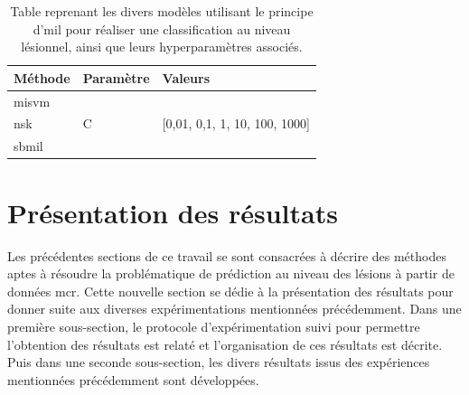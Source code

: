 \begin{table}[H]
    \centering
    \begin{tabular}{lll}
    \toprule
    \textbf{Méthode}    & \textbf{Paramètre}& \textbf{Valeurs}                                  \\ \midrule
    \gls{misvm}         & \multirow{3}{*}{C}& \multirow{3}{*}{[0,01, 0,1, 1, 10, 100, 1000]}    \\ \cline{1-1}
    \gls{nsk}           &                   &                                                   \\ \cline{1-1} 
    \gls{sbmil}         &                   &                                                   \\ \bottomrule 
    \end{tabular}    
    \caption{Table reprenant les divers modèles utilisant le principe d'\gls{mil} pour réaliser une classification au niveau lésionnel, ainsi que leurs hyperparamètres associés.}
    \label{tab:patient_decision_weak_hyperparameters}
\end{table}\par
\clearpage

\section{Présentation des résultats}
Les précédentes sections de ce travail se sont consacrées à décrire des méthodes aptes à résoudre la problématique de prédiction au niveau des lésions à partir de données \gls{mcr}. Cette nouvelle section se dédie à la présentation des résultats pour donner suite aux diverses expérimentations mentionnées précédemment. Dans une première sous-section, le protocole d'expérimentation suivi pour permettre l'obtention des résultats est relaté et l'organisation de ces résultats est décrite. Puis dans une seconde sous-section, les divers résultats issus des expériences mentionnées précédemment sont développées.\par

